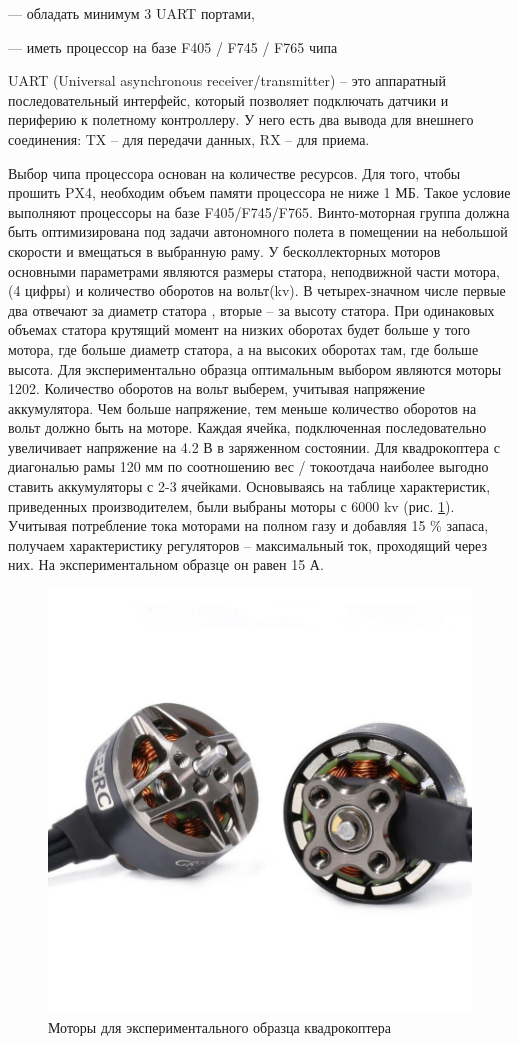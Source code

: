 --- обладать минимум 3 UART портами,

--- иметь процессор на базе F405 / F745 / F765 чипа

UART (Universal asynchronous receiver/transmitter) -- это аппаратный последовательный интерфейс, который позволяет подключать датчики и периферию к полетному контроллеру. У него есть два вывода для внешнего соединения: TX -- для передачи данных, RX -- для приема.

Выбор чипа процессора основан на количестве ресурсов. Для того, чтобы прошить PX4, необходим объем памяти процессора не ниже 1 МБ. Такое условие выполняют процессоры на базе F405/F745/F765.
Винто-моторная группа должна быть оптимизирована под задачи автономного полета в помещении на небольшой скорости и вмещаться в выбранную раму. У бесколлекторных моторов основными параметрами являются размеры статора, неподвижной части мотора, (4 цифры) и количество оборотов на вольт(kv). В четырех-значном числе первые два отвечают за диаметр статора , вторые -- за высоту статора. При одинаковых объемах статора крутящий момент на низких оборотах будет больше у того мотора, где больше диаметр статора, а на высоких оборотах там, где больше высота. Для экспериментально образца оптимальным выбором являются моторы 1202. Количество оборотов на вольт выберем, учитывая напряжение аккумулятора. Чем больше напряжение, тем меньше количество оборотов на вольт должно быть на моторе. Каждая ячейка, подключенная последовательно увеличивает напряжение на 4.2 В в заряженном состоянии. Для квадрокоптера с диагональю рамы 120 мм по соотношению вес / токоотдача наиболее выгодно ставить аккумуляторы с 2-3 ячейками. Основываясь на таблице характеристик, приведенных производителем, были выбраны моторы с 6000 kv (рис. \ref{fig:motor}).
Учитывая потребление тока моторами на полном газу и добавляя 15 \% запаса, получаем характеристику регуляторов -- максимальный ток, проходящий через них. На экспериментальном образце он равен 15 А.
\begin{figure}[H]
	\centering
	\includegraphics[width=0.5\linewidth]{pics/motor}
	\caption{Моторы для экспериментального образца квадрокоптера
	}
	\label{fig:motor} %
\end{figure}
